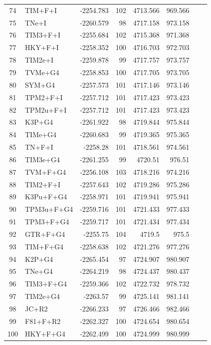 \documentclass[fleqn,letterpaper]{article}
\begin{document}
\begin{longtable}{clrrrrrr}
	74 & TIM+F+I & -2254.783 & 102 & 4713.566 & 969.566 \\ 
	75 & TNe+I & -2260.579 & 98 & 4717.158 & 973.158 \\ 
	76 & TIM3+F+I & -2255.684 & 102 & 4715.368 & 971.368 \\ 
	77 & HKY+F+I & -2258.352 & 100 & 4716.703 & 972.703 \\ 
	78 & TIM2e+I & -2259.878 & 99 & 4717.757 & 973.757 \\ 
	79 & TVMe+G4 & -2258.853 & 100 & 4717.705 & 973.705 \\ 
	80 & SYM+G4 & -2257.573 & 101 & 4717.146 & 973.146 \\ 
	81 & TPM2+F+I & -2257.712 & 101 & 4717.423 & 973.423 \\ 
	82 & TPM2u+F+I & -2257.712 & 101 & 4717.423 & 973.423 \\ 
	83 & K3P+G4 & -2261.922 & 98 & 4719.844 & 975.844 \\ 
	84 & TIMe+G4 & -2260.683 & 99 & 4719.365 & 975.365 \\ 
	85 & TN+F+I & -2258.28 & 101 & 4718.561 & 974.561 \\ 
	86 & TIM3e+G4 & -2261.255 & 99 & 4720.51 & 976.51 \\ 
	87 & TVM+F+G4 & -2256.108 & 103 & 4718.216 & 974.216 \\ 
	88 & TIM2+F+I & -2257.643 & 102 & 4719.286 & 975.286 \\ 
	89 & K3Pu+F+G4 & -2258.971 & 101 & 4719.941 & 975.941 \\ 
	90 & TPM3u+F+G4 & -2259.716 & 101 & 4721.433 & 977.433 \\ 
	91 & TPM3+F+G4 & -2259.717 & 101 & 4721.434 & 977.434 \\ 
	92 & GTR+F+G4 & -2255.75 & 104 & 4719.5 & 975.5 \\ 
	93 & TIM+F+G4 & -2258.638 & 102 & 4721.276 & 977.276 \\ 
	94 & K2P+G4 & -2265.454 & 97 & 4724.907 & 980.907 \\ 
	95 & TNe+G4 & -2264.219 & 98 & 4724.437 & 980.437 \\ 
	96 & TIM3+F+G4 & -2259.366 & 102 & 4722.732 & 978.732 \\ 
	97 & TIM2e+G4 & -2263.57 & 99 & 4725.141 & 981.141 \\ 
	98 & JC+R2 & -2266.233 & 97 & 4726.466 & 982.466 \\ 
	99 & F81+F+R2 & -2262.327 & 100 & 4724.654 & 980.654 \\ 
	100 & HKY+F+G4 & -2262.499 & 100 & 4724.999 & 980.999 \\ 

\end{longtable}
\end{document}

